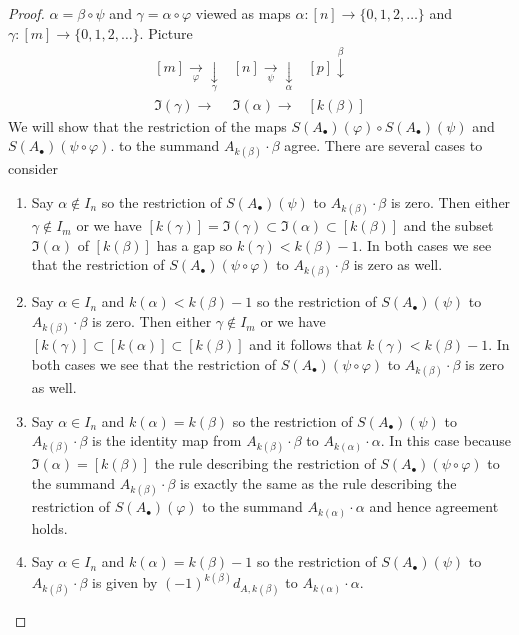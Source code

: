 \begin{proof}
$\alpha = \beta \circ \psi$ and $\gamma = \alpha \circ \varphi$
viewed as maps $\alpha : [n] \to \{0, 1, 2, \ldots\}$
and $\gamma : [m] \to \{0, 1, 2, \ldots\}$. Picture
$$
\begin{array}{ccc}[m] \underset{\varphi}{\longrightarrow}\underset{\gamma}{\downarrow} & [n] \underset{\psi}{\longrightarrow}\underset{\alpha}{\downarrow} & [p] \overset{\beta}{\downarrow} \\ \Im(\gamma) \longrightarrow & \Im(\alpha) \longrightarrow & [k(\beta)]\end{array}
$$
We will show that the restriction of the maps
$S(A_\bullet)(\varphi) \circ S(A_\bullet)(\psi)$ and
$S(A_\bullet)(\psi \circ \varphi)$.
to the summand $A_{k(\beta)} \cdot \beta$ agree.
There are several cases to consider
\begin{enumerate}
\item Say $\alpha \not \in I_n$ so the restriction of
$S(A_\bullet)(\psi)$ to $A_{k(\beta)} \cdot \beta$ is zero.
Then either $\gamma \not \in I_m$ or we have
$[k(\gamma)] = \Im(\gamma) \subset \Im(\alpha) \subset [k(\beta)]$
and the subset $\Im(\alpha)$ of $[k(\beta)]$ has a gap so
$k(\gamma) < k(\beta) - 1$. In both cases we see that
the restriction of
$S(A_\bullet)(\psi \circ \varphi)$ to $A_{k(\beta)} \cdot \beta$
is zero as well.
\item Say $\alpha \in I_n$ and $k(\alpha) < k(\beta) - 1$ so the restriction of
$S(A_\bullet)(\psi)$ to $A_{k(\beta)} \cdot \beta$ is zero.
Then either $\gamma \not \in I_m$ or we have
$[k(\gamma)] \subset [k(\alpha)] \subset [k(\beta)]$
and it follows that $k(\gamma) < k(\beta) - 1$. In both cases we see that
the restriction of
$S(A_\bullet)(\psi \circ \varphi)$ to $A_{k(\beta)} \cdot \beta$
is zero as well.
\item Say $\alpha \in I_n$ and $k(\alpha) = k(\beta)$ so the restriction of
$S(A_\bullet)(\psi)$ to $A_{k(\beta)} \cdot \beta$ is
the identity map from $A_{k(\beta)} \cdot \beta$ to
$A_{k(\alpha)} \cdot \alpha$. In this case because $\Im(\alpha) =[k(\beta)]$
the rule describing the restriction of $S(A_\bullet)(\psi \circ \varphi)$
to the summand $A_{k(\beta)} \cdot \beta$ is exactly the same
as the rule describing the restriction of $S(A_\bullet)(\varphi)$
to the summand $A_{k(\alpha)} \cdot \alpha$ and hence agreement holds.
\item Say $\alpha \in I_n$ and $k(\alpha) = k(\beta) - 1$
so the restriction of $S(A_\bullet)(\psi)$ to $A_{k(\beta)} \cdot \beta$
is given by $(-1)^{k(\beta)}d_{A, k(\beta)}$ to $A_{k(\alpha)} \cdot \alpha$.

\end{enumerate}
\end{proof}
